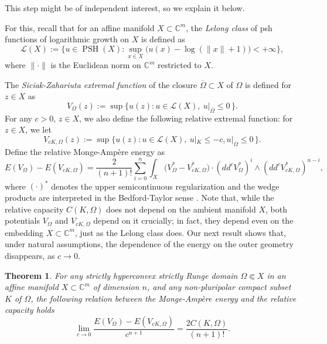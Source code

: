 \documentclass[12pt]{article}
\numberwithin{equation}{section}
\theoremstyle{theorem}
\newtheorem{thm}{Theorem}[section]
\theoremstyle{definition}
\theoremstyle{remark}
\newcommand{\comp}{\mathbb{C}}
\newcommand{\psh}{\operatorname{PSH}}
\begin{document}
	This step might be of independent interest, so we explain it below.
	\par 
	For this, recall that for an affine manifold $X \subset \comp^m$, the \emph{Lelong class} of psh functions of logarithmic growth on $X$ is defined as	
	\begin{equation}
		 \mathscr{L}(X) := \Big \{ u \in \psh(X) : \sup_{x \in X} \big(u(x) - \log(\| x \| + 1) \big) < +\infty \Big \},
	\end{equation}
	where $\|\cdot\|$ is the Euclidean norm on $\comp^m$ restricted to $X$.
	\par 
	The \emph{Siciak-Zahariuta extremal function} of the closure $\overline{\Omega} \subset X$ of $\Omega$ is defined for $z \in X$ as
	\begin{equation}\label{eq_extr}
		V_{\Omega}(z) := \sup\big\{ u(z) : u \in \mathscr{L}(X),\ u|_{\overline{\Omega}} \leq 0 \,\big\}.
	\end{equation}
	For any $c > 0$, $z \in X$, we also define the following relative extremal function: for $z \in X$, we let
	\begin{equation}\label{eq_rel_extr}
		V_{c K, \Omega}(z) := \sup\big\{ u(z) : u \in \mathscr{L}(X),\ u|_{K} \leq - c, u|_{\overline{\Omega}} \leq 0 \,\big\}.
	\end{equation}
	Define the relative Monge-Ampère energy as
	\begin{equation}\label{eq_energy}
		E(V_{\Omega}) - E(V_{c K, \Omega})
		=
		\frac{2}{(n + 1)!}
		\sum_{i = 0}^{n} \int_X \big( V_{\Omega}^* - V_{c K, \Omega}^* \big)
		 \cdot (dd^c V_{\Omega}^*)^i \wedge (dd^c V_{c K, \Omega}^*)^{n - i},
	\end{equation}
	where $(\cdot)^*$ denotes the upper semicontinuous regularization and the wedge products are interpreted in the Bedford-Taylor sense \cite{BedfordTaylor}.
	Note that, while the relative capacity $C(K, \Omega)$ does not depend on the ambient manifold $X$, both potentials $V_{\Omega}$ and $V_{c K, \Omega}$ depend on it crucially; in fact, they depend even on the embedding $X \subset \comp^m$, just as the Lelong class does.
	Our next result shows that, under natural assumptions, the dependence of the energy on the outer geometry disappears, as $c \to 0$.
	\begin{thm}\label{thm_rel_cap}
		For any strictly hyperconvex strictly Runge domain $\Omega \Subset X$ in an affine manifold $X \subset \comp^m$ of dimension $n$, and any non-pluripolar compact subset $K$ of $\Omega$, the following relation between the Monge-Ampère energy and the relative capacity holds
		\begin{equation}\label{eq_thm_rel_cap}
			\lim_{c \to 0} \frac{ E(V_{\Omega}) - E(V_{c K, \Omega})}{c^{n + 1}}
			=
			\frac{2 C(K, \Omega)}{(n + 1)!}.
		\end{equation}
	\end{thm}
\end{document}
